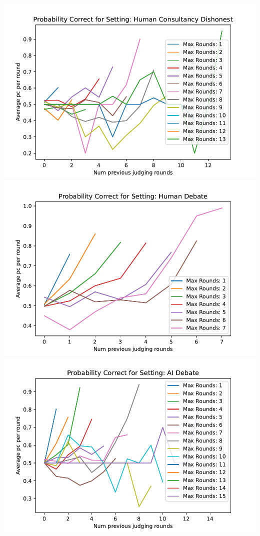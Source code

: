 \documentclass[
]{article}
\begin{document}
\includegraphics[width=1\linewidth]{debate-2309_files/figure-latex/strat-1}
\includegraphics[width=1\linewidth]{debate-2309_files/figure-latex/strat-2}
\includegraphics[width=1\linewidth]{debate-2309_files/figure-latex/strat-3}
\end{document}
